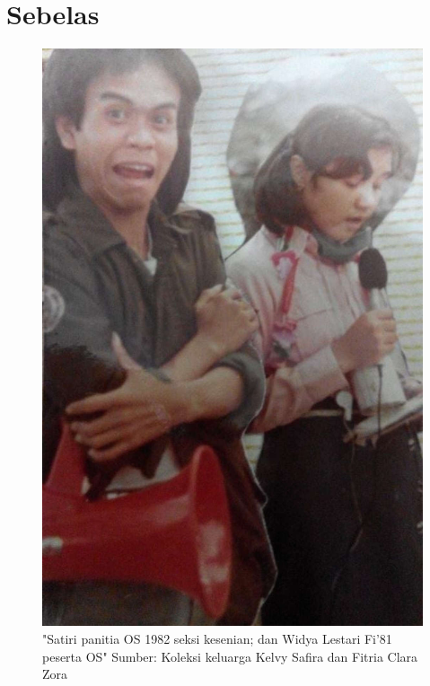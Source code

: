 
\chapter{Sebelas}

\begin{figure}[htbp]
\centerline{\includegraphics[scale=1.0]{01-11-01}}
\caption{"Satiri panitia OS 1982 seksi kesenian; dan Widya Lestari Fi’81 peserta OS" Sumber: Koleksi keluarga Kelvy Safira dan Fitria Clara Zora}
\label{01-11-01}
\end{figure}
%

